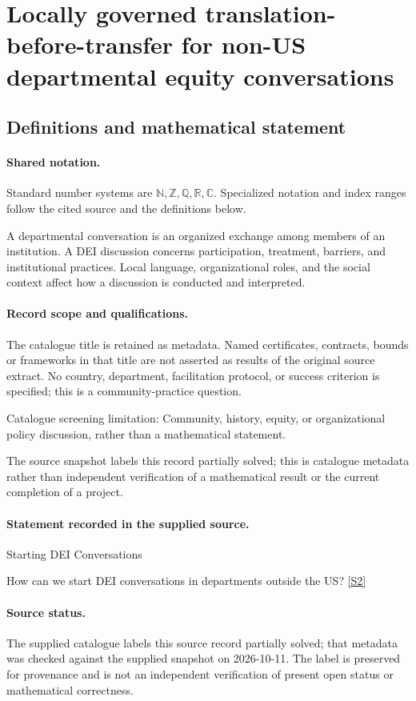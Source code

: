 \documentclass[11pt]{article}
\newcommand{\sref}[2]{\hyperlink{source:#1:#2}{[S#2]}}
\begin{document}
\section{Locally governed translation-before-transfer for non-US departmental equity conversations}\label{statement}

\subsection{Definitions and mathematical statement}

\paragraph{Shared notation.}Standard number systems are $\mathbb N,\mathbb Z,\mathbb Q,\mathbb R,\mathbb C$. Specialized notation and index ranges follow the cited source and the definitions below.


A departmental conversation is an organized exchange among members of an institution. A DEI discussion concerns participation, treatment, barriers, and institutional practices. Local language, organizational roles, and the social context affect how a discussion is conducted and interpreted.
\paragraph{Record scope and qualifications.}
The catalogue title is retained as metadata. Named certificates, contracts, bounds or frameworks in that title are not asserted as results of the original source extract.
No country, department, facilitation protocol, or success criterion is specified; this is a community-practice question.

Catalogue screening limitation: Community, history, equity, or organizational policy discussion, rather than a mathematical statement.

The source snapshot labels this record partially solved; this is catalogue metadata rather than independent verification of a mathematical result or the current completion of a project.
\paragraph{Statement recorded in the supplied source.}
Starting DEI Conversations

How can we start DEI conversations in departments outside the US? \sref{statement}{2}
\paragraph{Source status.}
The supplied catalogue labels this source record partially solved; that metadata was checked against the supplied snapshot on 2026-10-11. The label is preserved for provenance and is not an independent verification of present open status or mathematical correctness.
\end{document}
